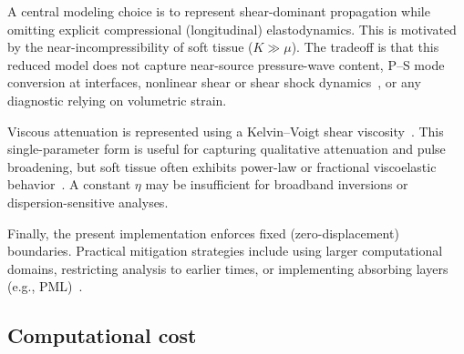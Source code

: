\documentclass{iopjournal}
\begin{document}
A central modeling choice is to represent shear-dominant propagation while
omitting explicit compressional (longitudinal) elastodynamics. This is
motivated by the near-incompressibility of soft tissue ($K\gg\mu$). The
tradeoff is that this reduced model does not capture near-source pressure-wave
content, P--S mode conversion at interfaces, nonlinear shear or shear shock
dynamics~\cite{tripathi2017shearshock,espindola2017shearshock,tripathi2019shearshock2d},
or any diagnostic relying on volumetric strain.

Viscous attenuation is represented using a Kelvin--Voigt shear
viscosity~\cite{catheline2004viscoelastic,ferry1980viscoelasticity}. This
single-parameter form is useful for capturing qualitative attenuation and pulse
broadening, but soft tissue often exhibits power-law or fractional viscoelastic
behavior~\cite{urban2012review}. A constant $\eta$ may be insufficient for
broadband inversions or dispersion-sensitive analyses.

Finally, the present implementation enforces fixed (zero-displacement)
boundaries. Practical mitigation strategies include using larger computational
domains, restricting analysis to earlier times, or implementing absorbing layers
(e.g., PML)~\cite{berenger1994perfect,collino2001application}.


\subsection{Computational cost}
\end{document}
